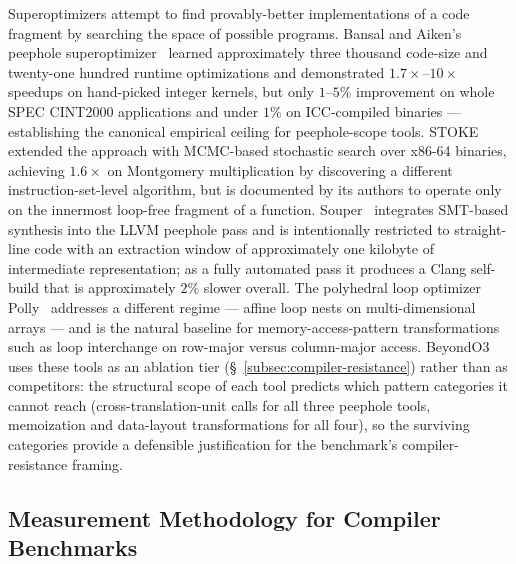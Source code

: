 Superoptimizers attempt to find provably-better implementations of a code fragment by searching the space of possible programs. Bansal and Aiken's peephole superoptimizer~\cite{bansal2006gso} learned approximately three thousand code-size and twenty-one hundred runtime optimizations and demonstrated $1.7\times$--$10\times$ speedups on hand-picked integer kernels, but only $1$--$5\%$ improvement on whole SPEC CINT2000 applications and under $1\%$ on ICC-compiled binaries --- establishing the canonical empirical ceiling for peephole-scope tools. STOKE~\cite{schkufza2013stoke} extended the approach with MCMC-based stochastic search over x86-64 binaries, achieving $1.6\times$ on Montgomery multiplication by discovering a different instruction-set-level algorithm, but is documented by its authors to operate only on the innermost loop-free fragment of a function. Souper~\cite{sasnauskas2017souper} integrates SMT-based synthesis into the LLVM peephole pass and is intentionally restricted to straight-line code with an extraction window of approximately one kilobyte of intermediate representation; as a fully automated pass it produces a Clang self-build that is approximately $2\%$ slower overall. The polyhedral loop optimizer Polly~\cite{grosser2012polly} addresses a different regime --- affine loop nests on multi-dimensional arrays --- and is the natural baseline for memory-access-pattern transformations such as loop interchange on row-major versus column-major access. BeyondO3 uses these tools as an ablation tier (\S~\ref{subsec:compiler-resistance}) rather than as competitors: the structural scope of each tool predicts which pattern categories it cannot reach (cross-translation-unit calls for all three peephole tools, memoization and data-layout transformations for all four), so the surviving categories provide a defensible justification for the benchmark's compiler-resistance framing.

\subsection{Measurement Methodology for Compiler Benchmarks}

